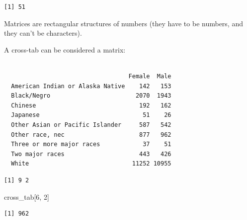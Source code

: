 \documentclass[
  letterpaper,
]{book}
\newenvironment{Shaded}{\begin{snugshade}}{\end{snugshade}}
\newcommand{\DecValTok}[1]{\textcolor[rgb]{0.68,0.00,0.00}{#1}}
\newcommand{\FunctionTok}[1]{\textcolor[rgb]{0.28,0.35,0.67}{#1}}
\newcommand{\NormalTok}[1]{\textcolor[rgb]{0.00,0.23,0.31}{#1}}
\newcommand{\OtherTok}[1]{\textcolor[rgb]{0.00,0.23,0.31}{#1}}
\newcommand{\SpecialCharTok}[1]{\textcolor[rgb]{0.37,0.37,0.37}{#1}}
\theoremstyle{definition}
\theoremstyle{definition}
\theoremstyle{plain}
\theoremstyle{definition}
\theoremstyle{plain}
\theoremstyle{plain}
\theoremstyle{remark}
\begin{document}
\begin{verbatim}
[1] 51
\end{verbatim}

Matrices are rectangular structures of numbers (they have to be numbers,
and they can't be characters).

A cross-tab can be considered a matrix:

\begin{Shaded}
\end{Shaded}

\begin{verbatim}
                                  
                                   Female  Male
  American Indian or Alaska Native    142   153
  Black/Negro                        2070  1943
  Chinese                             192   162
  Japanese                             51    26
  Other Asian or Pacific Islander     587   542
  Other race, nec                     877   962
  Three or more major races            37    51
  Two major races                     443   426
  White                             11252 10955
\end{verbatim}

\begin{Shaded}
\end{Shaded}

\begin{verbatim}
[1] 9 2
\end{verbatim}

\begin{Shaded}
\begin{Highlighting}[]
\NormalTok{cross\_tab[}\DecValTok{6}\NormalTok{, }\DecValTok{2}\NormalTok{]}
\end{Highlighting}
\end{Shaded}

\begin{verbatim}
[1] 962
\end{verbatim}
\end{document}
